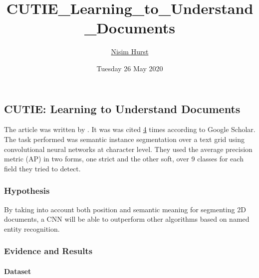 \documentclass[]{article}
\title{CUTIE\_Learning\_to\_Understand\_Documents}
\author{\href{mailto:langheran@gmail.com}{Nisim Hurst}}
\date{Tuesday 26 May 2020}
\let\oldparagraph\paragraph
\renewcommand{\paragraph}[1]{\oldparagraph{#1}\mbox{}}
\begin{document}
\maketitle

\label{toc}

\hypertarget{cutie-learning-to-understand-documents}{%
\subsection{CUTIE: Learning to Understand Documents}\label{cutie-learning-to-understand-documents}}

The article was written by \autocite{zhao2019cutie}. It was was cited \href{https://scholar.google.com/scholar?cites=9864657072346957710\&as_sdt=2005\&sciodt=0,5\&hl=en}{4} times according to Google Scholar. The task performed was semantic instance segmentation over a text grid using convolutional neural networks at character level. They used the average precision metric (AP) in two forms, one strict and the other soft, over 9 classes for each field they tried to detect.

\hypertarget{hypothesis}{%
\subsubsection{Hypothesis}\label{hypothesis}}

By taking into account both position and semantic meaning for segmenting 2D documents, a CNN will be able to outperform other algorithms based on named entity recognition.

\hypertarget{evidence-and-results}{%
\subsubsection{Evidence and Results}\label{evidence-and-results}}

\hypertarget{dataset}{%
\paragraph{Dataset}\label{dataset}}
\end{document}
